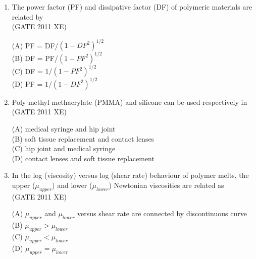 \documentclass[journal,12pt,onecolumn]{IEEEtran}
\begin{document}
\begin{enumerate}
\begin{enumerate}
\begin{enumerate}[label=\arabic*)]
\hfill{(GATE 2011 XE)} \\
\begin{multicols}{2}
(A) force sheared by fibre glass ($P_f$) and matrix ($P_m$) should be equal\\
(B) strain as well as force in fibre ($\epsilon_f$, $P_f$) are both equal to strain and the force in matrix ($\epsilon_m$, $P_m$)\\
(C) strain at the interface between fibre glass ($\epsilon_f$) and matrix ($\epsilon_m$) should be equal\\
(D) None of the above is true
\end{multicols}

\item The power factor (PF) and dissipative factor (DF) of polymeric materials are related by\\

\hfill{(GATE 2011 XE)} \\
\begin{multicols}{4}
(A) PF = DF/$(1 - DF^2)^{1/2}$\\
(B) DF = PF/$(1 - PF^2)^{1/2}$\\
(C) DF = $1/(1 - PF^2)^{1/2}$\\
(D) PF = $1/(1 - DF^2)^{1/2}$
\end{multicols}

\item Poly methyl methacrylate (PMMA) and silicone can be used respectively in\\

\hfill{(GATE 2011 XE)} \\
\begin{multicols}{2}
(A) medical syringe and hip joint\\
(B) soft tissue replacement and contact lenses\\
(C) hip joint and medical syringe\\
(D) contact lenses and soft tissue replacement
\end{multicols}

\item In the log (viscosity) versus log (shear rate) behaviour of polymer melts, the upper ($\mu_{upper}$) and lower ($\mu_{lower}$) Newtonian viscosities are related as\\

\hfill{(GATE 2011 XE)} \\
\begin{multicols}{2}
(A) $\mu_{upper}$ and $\mu_{lower}$ versus shear rate are connected by discontinuous curve\\
(B) $\mu_{upper} > \mu_{lower}$\\
(C) $\mu_{upper} < \mu_{lower}$\\
(D) $\mu_{upper} = \mu_{lower}$
\end{multicols}


\end{enumerate}
\end{enumerate}
\end{enumerate}
\end{document}
